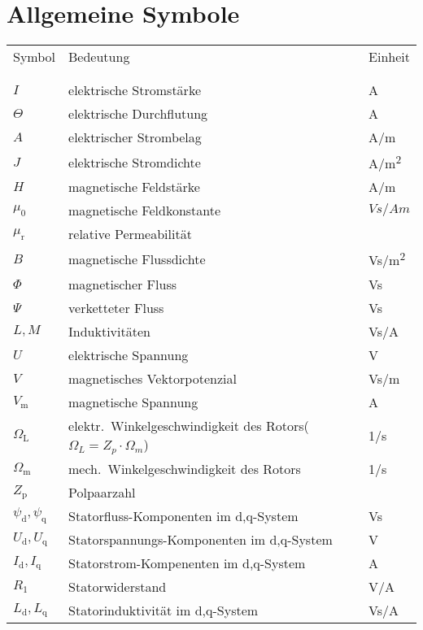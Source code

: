 \section*{Allgemeine Symbole}\label{s.sym.alg}
\begin{flushleft}\begin{tabularx}{\textwidth}{l l X}
Symbol & Bedeutung	& Einheit\\
\\
\hline
\\ 
$I$	& elektrische Stromstärke	&	\si{A} \\
$\Theta$	&	elektrische Durchflutung 	&	\si{A}	\\
$A$			&	elektrischer Strombelag  	&  	\si{A/m}\\ 
$J$			&	elektrische Stromdichte		&	\si{A/m^2} \\	
$H$			&	magnetische Feldstärke		&	\si{A/m}\\
$\mu_\mathrm{0}$		&	magnetische Feldkonstante	&	$Vs/Am$\\
$\mu_\mathrm{r}$		&	relative Permeabilität		&	\\
$B$			&	magnetische Flussdichte		&	\si{Vs/m^2}\\
$\Phi$		&	magnetischer Fluss			&	\si{Vs} \\
$\Psi$		&	verketteter Fluss			&	\si{Vs} \\
$L, M$		&	Induktivitäten				&	\si{Vs/A}\\
$U$			&	elektrische Spannung		&	\si{V} \\
$V$			&	magnetisches Vektorpotenzial&	\si{Vs/m}\\
$V_\mathrm{m}$		&	magnetische Spannung		&	\si{A} \\
$\Omega_\mathrm{L}$	&	elektr.\ Winkelgeschwindigkeit des Rotors($\Omega_L = Z_p\cdot \Omega_m$) & \si{1/s} \\
$\Omega_\mathrm{m}$	&	mech.\ Winkelgeschwindigkeit des Rotors & \si{1/s} \\
$Z_\mathrm{p}$		&	Polpaarzahl					&	\\
$\psi_\mathrm{d}, \psi_\mathrm{q}$	&	Statorfluss-Komponenten im d,q-System &	\si{Vs} \\
$U_\mathrm{d}, U_\mathrm{q}$	&	Statorspannungs-Komponenten im d,q-System &	\si{V} \\
$I_\mathrm{d}, I_\mathrm{q}$	&	Statorstrom-Kompenenten im d,q-System	&	\si{A} \\
$R_\mathrm{1}$		&	Statorwiderstand			&	\si{V/A} \\
$L_\mathrm{d}, L_\mathrm{q}$	& 	Statorinduktivität im d,q-System & \si{Vs/A}
\end{tabularx}\end{flushleft}
